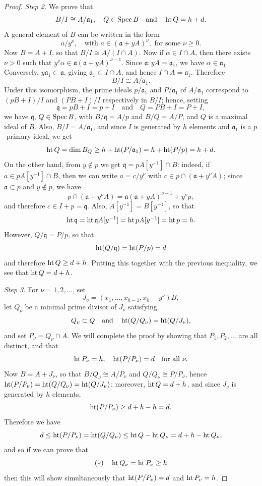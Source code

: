 \begin{proof}
\textit{Step 2.} We prove that
\[
  B/I \cong A/\mathfrak{a}_1, \quad Q \in \operatorname{Spec} B \quad \text{and} \quad \operatorname{ht} Q = h + d.
\]
A general element of $B$ can be written in the form
\[
  a/y^\nu, \quad \text{with } a \in (\mathfrak{a} + yA)^\nu, \text{ for some } \nu \ge 0.
\]
Now $B = A + I$, so that $B/I \cong A/(I \cap A)$. Now if $\alpha \in I \cap A$, then there
exists $\nu > 0$ such that $y^\nu\alpha \in \mathfrak{a}(\mathfrak{a} + yA)^{\nu-1}$. Since
$\mathfrak{a} : yA = \mathfrak{a}_1$, we have $\alpha \in \mathfrak{a}_1$. Conversely,
$y\mathfrak{a}_1 \subset \mathfrak{a}$, giving $\mathfrak{a}_1 \subset I \cap A$, and hence $I \cap A = \mathfrak{a}_1$.
Therefore
\[
  B/I \cong A/\mathfrak{a}_1.
\]
Under this isomorphism, the prime ideals $p/\mathfrak{a}_1$ and $P/\mathfrak{a}_1$ of $A/\mathfrak{a}_1$
correspond to $(pB + I)/I$ and $(PB + I)/I$ respectively in $B/I$; hence, setting
\[
  \mathfrak{q} = pB + I = p + I \quad \text{and} \quad Q = PB + I = P + I,
\]
we have $\mathfrak{q}$, $Q \in \operatorname{Spec} B$, with $B/\mathfrak{q} = A/p$ and $B/Q = A/P$, and $Q$ is a
maximal ideal of $B$. Also, $B/I = A/\mathfrak{a}_1$, and since $I$ is generated by $h$
elements and $\mathfrak{a}_1$ is a $p$-primary ideal, we get
\[
  \operatorname{ht} Q = \dim B_Q \ge h + \operatorname{ht}(P/\mathfrak{a}_1) = h + \operatorname{ht}(P/p) = h + d.
\]
On the other hand, from $y \notin p$ we get $\mathfrak{q} = pA[y^{-1}] \cap B$: indeed, if
$a \in pA[y^{-1}] \cap B$, then we can write $a = c/y^\nu$ with
$c \in p \cap (\mathfrak{a} + y^\nu A)$; since $\mathfrak{a} \subset p$ and $y \notin p$, we have
\[
  p \cap (\mathfrak{a} + y^\nu A) = \mathfrak{a}(\mathfrak{a} + yA)^{\nu-1} + y^\nu p,
\]
and therefore $c \in I + p = \mathfrak{q}$. Also, $A[y^{-1}] = B[y^{-1}]$, so that
\[
  \operatorname{ht} \mathfrak{q} = \operatorname{ht} \mathfrak{q}A[y^{-1}] = \operatorname{ht} pA[y^{-1}] = \operatorname{ht} p = h.
\]
However, $Q/\mathfrak{q} = P/p$, so that
\[
  \operatorname{ht}(Q/\mathfrak{q}) = \operatorname{ht}(P/p) = d
\]
and therefore $\operatorname{ht} Q \ge d + h$. Putting this together with the previous
inequality, we see that $\operatorname{ht} Q = d + h$.

\textit{Step 3.} For $\nu = 1, 2, \ldots$, set
\[
  J_\nu = (x_1, \ldots, x_{h-1}, x_h - y^\nu)B,
\]
let $Q_\nu$ be a minimal prime divisor of $J_\nu$ satisfying
\[
  Q_\nu \subset Q \quad \text{and} \quad \operatorname{ht}(Q/Q_\nu) = \operatorname{ht}(Q/J_\nu),
\]
and set $P_\nu = Q_\nu \cap A$. We will complete the proof by showing that
$P_1, P_2, \ldots$ are all distinct, and that
\[
  \operatorname{ht} P_\nu = h, \quad \operatorname{ht}(P/P_\nu) = d \quad \text{for all } \nu.
\]
Now $B = A + J_\nu$, so that $B/Q_\nu \cong A/P_\nu$ and $Q/Q_\nu \cong P/P_\nu$, hence
$\operatorname{ht}(P/P_\nu) = \operatorname{ht}(Q/Q_\nu) = \operatorname{ht}(Q/J_\nu)$; moreover, $\operatorname{ht} Q = d + h$, and since
$J_\nu$ is generated by $h$ elements,
\[
  \operatorname{ht}(P/P_\nu) \ge d + h - h = d.
\]
Therefore we have
\[
  d \le \operatorname{ht}(P/P_\nu) = \operatorname{ht}(Q/Q_\nu) \le \operatorname{ht} Q - \operatorname{ht} Q_\nu = d + h - \operatorname{ht} Q_\nu,
\]
and so if we can prove that
\[
  (*) \quad \operatorname{ht} Q_\nu = \operatorname{ht} P_\nu \ge h
\]
then this will show simultaneously that $\operatorname{ht}(P/P_\nu) = d$ and $\operatorname{ht} P_\nu = h$.


\end{proof}
